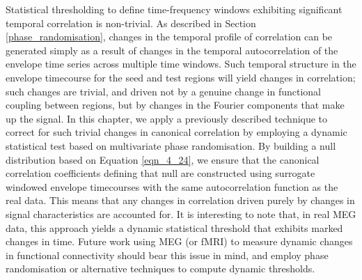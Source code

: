 Statistical thresholding to define time-frequency windows exhibiting significant temporal correlation is non-trivial. As described in Section \ref{phase_randomisation}, changes in the temporal profile of correlation can be generated simply as a result of changes in the temporal autocorrelation of the envelope time series across multiple time windows. Such temporal structure in the envelope timecourse for the seed and test regions will yield changes in correlation; such changes are trivial, and driven not by a genuine change in functional coupling between regions, but by changes in the Fourier components that make up the signal. In this chapter, we apply a previously described technique \citep{Prichard1994} to correct for such trivial changes in canonical correlation by employing a dynamic statistical test based on multivariate phase randomisation. By building a null distribution based on Equation \ref{eqn_4_24}, we ensure that the canonical correlation coefficients defining that null are constructed using surrogate windowed envelope timecourses with the same autocorrelation function as the real data. This means that any changes in correlation driven purely by changes in signal characteristics are accounted for. It is interesting to note that, in real MEG data, this approach yields a dynamic statistical threshold that exhibits marked changes in time. Future work using MEG (or fMRI) to measure dynamic changes in functional connectivity should bear this issue in mind, and employ phase randomisation or alternative techniques to compute dynamic thresholds.

